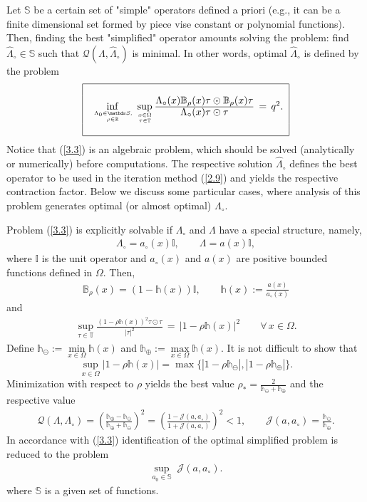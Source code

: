 \documentclass[amstex,amstext,amsfonts,epsf,12pt] {amsart}
\newcommand\be{\begin{eqnarray*}}
\newcommand\ee{\end{eqnarray*}}
\newcommand\ben{\begin{eqnarray}}
\newcommand\een{\end{eqnarray}}
\def\be{\begin{eqnarray*}}
\def\ee{\end{eqnarray*}}
\def\ben{\begin{eqnarray}}
\def\een{\end{eqnarray}}
\def\Frame#1{
\begin{tabular}{|c|} \hline
   \\
$\
#1
$
\\
\\ \hline
\end{tabular}
}
\begin{document}
Let $\mathds S$ be a certain set of "simple" operators
defined a priori (e.g., it can be a finite dimensional
set formed by piece vise constant or polynomial functions).
Then, finding the best "simplified" operator amounts
solving the problem: find $\widehat\Lambda_\circ\in \mathbb S$ such that
${\mathcal Q}(\Lambda,\widehat\Lambda_\circ)$ is minimal. In other words,
optimal $\widehat\Lambda_\circ$ is defined by the problem
\begin{equation}
\label{3.3}
\Frame{\inf\limits_{\,\Lambda_0\in \mathds S,\atop \rho \in \mathbb R}\, 
\sup\limits_{ x \in \Omega  \atop \tau\in {\mathbb T}}
\frac{\displaystyle\Lambda_\circ(x) {\mathbb B}_\rho(x) \tau\odot 
{\mathbb B}_\rho (x) \tau}{\displaystyle \Lambda_\circ(x) \tau\odot \tau}\,=\,q^2.
}
\end{equation}
Notice that  (\ref{3.3}) is an algebraic
problem, which should be solved (analytically or numerically) 
before computations. The respective solution $\widehat\Lambda_\circ$
defines the best operator to be used in the iteration method (\ref{2.9}) 
and yields the respective contraction factor.
Below we discuss some  particular cases,
where analysis of this problem generates optimal (or almost
optimal) $\Lambda_\circ$.



Problem  (\ref{3.3}) is explicitly solvable if $\Lambda_\circ$ and $\Lambda$ have a special structure, namely,
\be 
\Lambda_\circ=a_\circ(x) {\mathbb I},\qquad
\Lambda=a(x) {\mathbb I},
\ee
where ${\mathbb I}$ is the unit operator and $a_\circ(x)$ and $a(x)$ are positive bounded functions defined in  $\Omega$. Then, \be 
 {\mathbb B}_\rho(x)=(1-{\mathds h}(x)){\mathbb I},\qquad{\mathds h}(x):=\frac{a(x)}{a_\circ(x)}
\ee
 and
  \be 
\sup\limits_{\tau \in {\mathbb T}}
\frac{\left(1-\rho {\mathds h}(x)\right)^2\tau\odot\tau}
{|\tau|^2}\,=\,|1-\rho{\mathds h}(x)|^2\qquad \forall\,x\in \Omega .
\ee
Define
${\mathds h}_\ominus:=\min\limits_{x\in \Omega}{\mathds h}(x)$
and
${\mathds h}_\oplus:=\max\limits_{x\in \Omega}{\mathds h}(x)$.
It is not difficult to show that
$$
\sup\limits_{x\in \Omega} |1-\rho {\mathds h}(x)|=\max\{|1-\rho {\mathds h}_\ominus|,|1-\rho {\mathds h}_\oplus|\}.
$$
Minimization with respect to $\rho$ yields the best value
 $\rho_*=\frac{2}{{\mathds h}_\ominus+{\mathds h}_\oplus}$ and the respective value
 \ben
 \label{3.4} 
 {\mathcal Q}(\Lambda,\Lambda_\circ)=\left(\frac{{\mathds h}_\oplus-{\mathds h}_\ominus}{{\mathds h}_\oplus+{\mathds h}_\ominus}\right)^2=
 \left(\frac{1-{\mathcal J(a,a_\circ)}}
 { 1+{\mathcal J(a,a_\circ)}}\right)^2<1,\qquad {\mathcal J(a,a_\circ)}=
\frac{ {\mathds h}_\ominus}{{\mathds h}_\oplus}.
 \een
In accordance with (\ref{3.3}) identification of the optimal simplified
problem is reduced to the problem
\ben
\label{3.5}
\sup\limits_{a_0\in {\mathbb S}}\;{\mathcal J(a,a_\circ)}.
\een
where ${\mathbb S}$ is a given set of functions.
\end{document}

